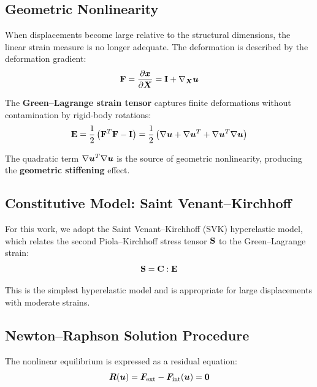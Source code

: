 \subsection{Geometric Nonlinearity}

When displacements become large relative to the structural dimensions, the linear strain measure is no longer adequate. The deformation is described by the deformation gradient:
\begin{equation}
    \mathbf{F} = \frac{\partial \bm{x}}{\partial \bm{X}} = \mathbf{I} + \nabla_{\bm{X}} \bm{u}
    \label{eq:deformation-gradient}
\end{equation}

The \textbf{Green--Lagrange strain tensor} captures finite deformations without contamination by rigid-body rotations:
\begin{equation}
    \mathbf{E} = \frac{1}{2}\left(\mathbf{F}^T \mathbf{F} - \mathbf{I}\right) = \frac{1}{2}\left(\nabla\bm{u} + \nabla\bm{u}^T + \nabla\bm{u}^T \nabla\bm{u}\right)
    \label{eq:green-lagrange}
\end{equation}

The quadratic term $\nabla\bm{u}^T \nabla\bm{u}$ is the source of geometric nonlinearity, producing the \textbf{geometric stiffening} effect.

\subsection{Constitutive Model: Saint Venant--Kirchhoff}

For this work, we adopt the Saint Venant--Kirchhoff (SVK) hyperelastic model, which relates the second Piola--Kirchhoff stress tensor $\mathbf{S}$ to the Green--Lagrange strain:
\begin{equation}
    \mathbf{S} = \mathbf{C} : \mathbf{E}
\end{equation}

This is the simplest hyperelastic model and is appropriate for large displacements with moderate strains.

\subsection{Newton--Raphson Solution Procedure}

The nonlinear equilibrium is expressed as a residual equation:
\begin{equation}
    \bm{R}(\bm{u}) = \bm{F}_{\text{ext}} - \bm{F}_{\text{int}}(\bm{u}) = \bm{0}
\end{equation}


